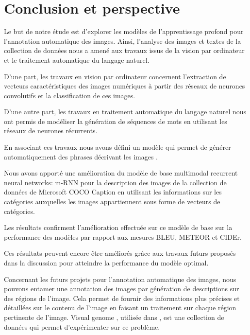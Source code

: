 


\chapter{Conclusion et perspective}
 Le but de notre étude est d'explorer les modèles de l'apprentissage profond pour l'annotation automatique des images. Ainsi, l'analyse des images et textes de la collection de données nous a amené aux travaux issus de la vision par ordinateur et le traitement automatique du langage naturel. 

D'une part, les travaux en vision par ordinateur concernent l'extraction de vecteurs caractéristiques des images numériques à partir des réseaux de neurones convolutifs et la classification de ces images. 


D'une autre part, les travaux en traitement automatique du langage naturel nous ont permis de modéliser la génération de séquences de mots en utilisant les réseaux de neurones récurrents.

En associant ces travaux nous avons défini un modèle qui permet de générer automatiquement des phrases décrivant les images .

Nous avons apporté une amélioration du modèle de base multimodal recurrent neural networks: m-RNN \cite{mao2014explain} \cite{mao2014deep} pour la description des images de la collection de données de Microsoft COCO Caption \cite{chen2015microsoft} en utilisant les informations sur les catégories auxquelles les images appartiennent sous forme de vecteurs de catégories.

Les résultats confirment l'amélioration effectuée sur ce modèle de base sur la performance des modèles par rapport aux mesures BLEU, METEOR et CIDEr.

Ces résultats peuvent encore être améliorés grâce aux travaux futurs proposés dans la discussion pour atteindre la performance du modèle optimal.

Concernant les futurs projets pour l'annotation automatique des images, nous pouvons entamer une annotation des images par génération de descriptions sur des régions de l'image. Cela permet de fournir des informations plus précises et détaillées sur le contenu de l'image en faisant un traitement sur chaque région pertinente de l'image. Visual genome \cite{krishna2016visual}, utilisée dans \cite{johnson2015densecap}, est une collection de données qui permet d'expérimenter sur ce problème.

